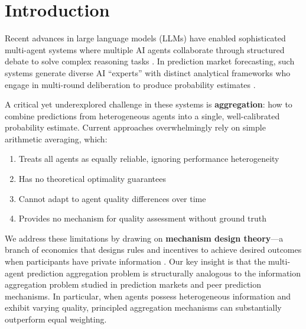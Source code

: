 \documentclass[conference]{IEEEtran}
\begin{document}
\section{Introduction}
\label{sec:intro}

Recent advances in large language models (LLMs) have enabled sophisticated multi-agent systems where multiple AI agents collaborate through structured debate to solve complex reasoning tasks \cite{du2023improving, liang2023encouraging}. In prediction market forecasting, such systems generate diverse AI ``experts'' with distinct analytical frameworks who engage in multi-round deliberation to produce probability estimates \cite{halawi2024approaching}.

A critical yet underexplored challenge in these systems is \textbf{aggregation}: how to combine predictions from heterogeneous agents into a single, well-calibrated probability estimate. Current approaches overwhelmingly rely on simple arithmetic averaging, which:

\begin{enumerate}
    \item Treats all agents as equally reliable, ignoring performance heterogeneity
    \item Has no theoretical optimality guarantees
    \item Cannot adapt to agent quality differences over time
    \item Provides no mechanism for quality assessment without ground truth
\end{enumerate}

We address these limitations by drawing on \textbf{mechanism design theory}---a branch of economics that designs rules and incentives to achieve desired outcomes when participants have private information \cite{nisan2007algorithmic}. Our key insight is that the multi-agent prediction aggregation problem is structurally analogous to the information aggregation problem studied in prediction markets and peer prediction mechanisms. In particular, when agents possess heterogeneous information and exhibit varying quality, principled aggregation mechanisms can substantially outperform equal weighting.
\end{document}
